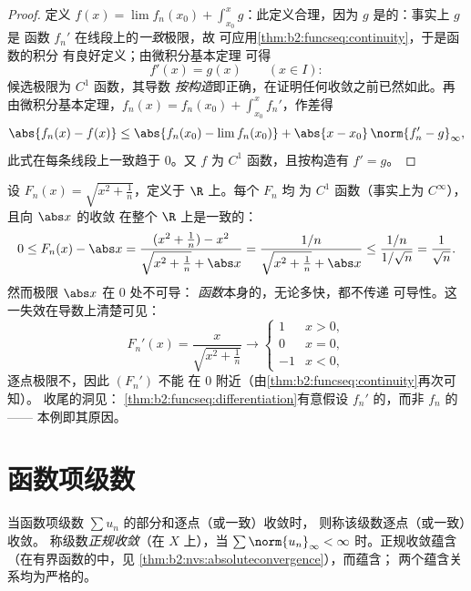 \begin{proof}
定义 $f(x) = \lim f_n(x_0) + \int_{x_0}^x g$：此定义合理，因为 $g$
是的：事实上 $g$ 是
函数 $f_n'$ 在线段上的\emph{一致}极限，故
可应用\cref{thm:b2:funcseq:continuity}，于是函数的积分
有良好定义；由微积分基本定理
可得
\[
f'(x) = g(x) \qquad (x \in I) :
\]
候选极限为 $C^1$ 函数，其导数
\emph{按构造}即正确，在证明任何收敛之前已然如此。再
由微积分基本定理，$f_n(x) = f_n(x_0) + \int_{x_0}^x
f_n'$，作差得
\[
\abs{f_n(x) - f(x)} \leq \abs{f_n(x_0) - \lim f_n(x_0)}
+ \abs{x - x_0}\,\norm{f_n' - g}_{\infty} ,
\]
此式在每条线段上一致趋于 $0$。又 $f$ 为 $C^1$
函数，且按构造有 $f' = g$。
\end{proof}

\begin{example}[为何假设加在导数上]\label{ex:b2:funcseq:sqrtabs}
设 $F_n(x) = \sqrt{x^2 + \frac1n}$，定义于 $\R$ 上。每个 $F_n$ 均
为 $C^1$ 函数（事实上为 $C^\infty$），且向 $\abs x$ 的收敛
在整个 $\R$ 上是一致的：
\[
0 \leq F_n(x) - \abs x
= \frac{(x^2 + \frac1n) - x^2}{\sqrt{x^2+\frac1n} + \abs x}
= \frac{1/n}{\sqrt{x^2 + \frac1n} + \abs x}
\leq \frac{1/n}{1/\sqrt n} = \frac{1}{\sqrt n} .
\]
然而极限 $\abs x$ 在 $0$ 处不可导：
\emph{函数}本身的，无论多快，都不传递
可导性。这一失效在导数上清楚可见：
\[
F_n'(x) = \frac{x}{\sqrt{x^2 + \frac1n}}
\longrightarrow \begin{cases} 1 & x > 0,\\ 0 & x = 0,\\
-1 & x < 0, \end{cases}
\]
逐点极限不，因此 $(F_n')$ 不能
在 $0$ 附近（由\cref{thm:b2:funcseq:continuity}再次可知）。
收尾的洞见：
\cref{thm:b2:funcseq:differentiation}有意假设
$f_n'$ 的，而非 $f_n$ 的 ——
本例即其原因。
\end{example}

\section{函数项级数}

\begin{definition}\label{def:b2:funcseq:series}
当函数项级数 $\sum u_n$ 的部分和逐点（或一致）收敛时，
则称该级数逐点（或一致）收敛。
称级数\emph{正规收敛}（在 $X$ 上），当 $\sum
\norm{u_n}_\infty < \infty$ 时。正规收敛蕴含
（在有界函数的中，见
\cref{thm:b2:nvs:absoluteconvergence}），而蕴含；
两个蕴含关系均为严格的。
\end{definition}

